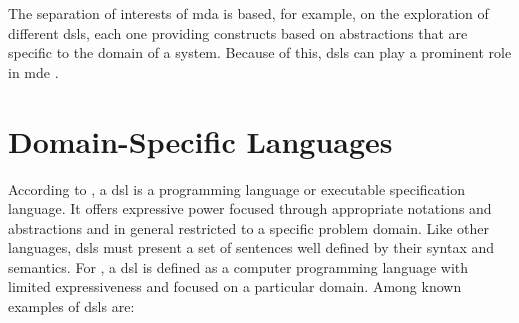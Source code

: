 The separation of interests of \ac{mda} is based, for example, on the exploration of different \acp{dsl}, each one providing constructs based on abstractions that are specific to the domain of a system.
Because of this, \acp{dsl} can play a prominent role in \ac{mde} \cite{Schmidt:2006, Fowler:2010}.



\section{Domain-Specific Languages}
\label{sec_back:dsl}

According to \cite{vanDeursen:2000}, a \ac{dsl} is a programming language or executable specification language. It offers expressive power focused through appropriate notations and abstractions and in general restricted to a specific problem domain.
Like other languages, \acp{dsl} must present a set of sentences well defined by their syntax and semantics.
For \cite{Fowler:2010}, a \ac{dsl} is defined as a computer programming language with limited expressiveness and focused on a particular domain.
Among known examples of \acp{dsl} are:


